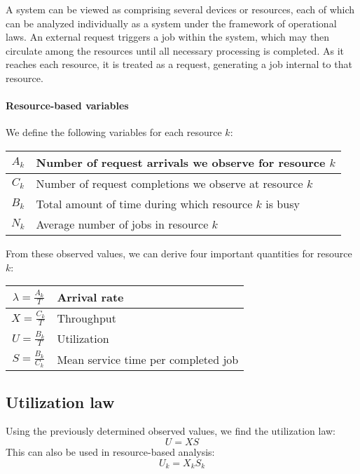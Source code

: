 A system can be viewed as comprising several devices or resources, each of which can be analyzed individually as a system under the framework of operational laws. 
An external request triggers a job within the system, which may then circulate among the resources until all necessary processing is completed. 
As it reaches each resource, it is treated as a request, generating a job internal to that resource.

\paragraph*{Resource-based variables}
We define the following variables for each resource $k$:
\begin{table}[H]
    \centering
    \begin{tabular}{|c|l|}
    \hline
    $A_k$ & Number of request arrivals we observe for resource $k$      \\ \hline
    $C_k$ & Number of request completions we observe at resource $k$    \\ \hline
    $B_k$ & Total amount of time during which resource $k$ is busy      \\ \hline
    $N_k$ & Average number of jobs in resource $k$                      \\ \hline
    \end{tabular}
\end{table}
From these observed values, we can derive four important quantities for resource $k$:
\begin{table}[H]
    \centering
    \begin{tabular}{|c|l|}
    \hline
    $\lambda=\frac{A_k}{T}$ & Arrival rate                        \\ \hline
    $X=\frac{C_k}{T}$       & Throughput                          \\ \hline
    $U=\frac{B_k}{T}$       & Utilization                         \\ \hline
    $S=\frac{B_k}{C_k}$     & Mean service time per completed job \\ \hline
    \end{tabular}
\end{table}
\renewcommand*{\arraystretch}{1}

\subsection{Utilization law}
Using the previously determined observed values, we find the utilization law:
\[U=XS\]
This can also be used in resource-based analysis:
\[U_k=X_k S_k\]

